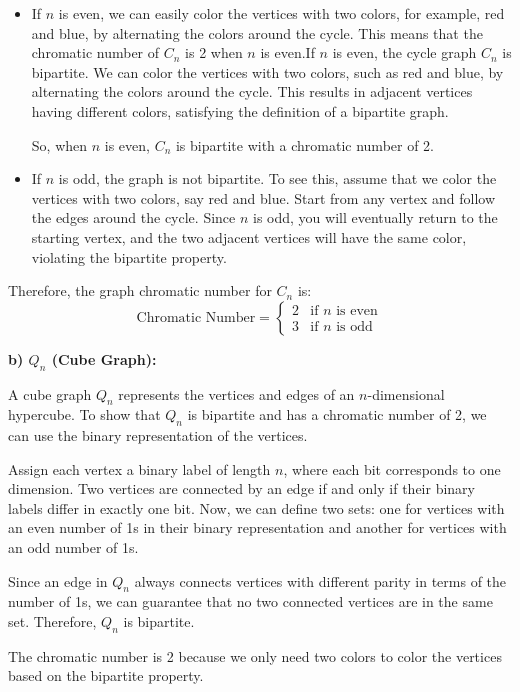 \documentclass[12pt]{article}
\begin{document}
\begin{itemize}
  \item If \(n\) is even, we can easily color the vertices with two colors, for example, red and blue, by alternating the colors around the cycle. This means that the chromatic number of \(C_n\) is 2 when \(n\) is even.If $n$ is even, the cycle graph $C_n$ is bipartite. We can color the vertices with two colors, such as red and blue, by alternating the colors around the cycle. This results in adjacent vertices having different colors, satisfying the definition of a bipartite graph.

So, when $n$ is even, $C_n$ is bipartite with a chromatic number of 2.

  \item If \(n\) is odd, the graph is not bipartite. To see this, assume that we color the vertices with two colors, say red and blue. Start from any vertex and follow the edges around the cycle. Since \(n\) is odd, you will eventually return to the starting vertex, and the two adjacent vertices will have the same color, violating the bipartite property.
\end{itemize}

Therefore, the graph chromatic number for \(C_n\) is:
\[
\text{Chromatic Number} = 
\begin{cases} 
2 & \text{if } n \text{ is even} \\
3 & \text{if } n \text{ is odd}
\end{cases}
\]

\textbf{b) \(Q_n\) (Cube Graph):}

A cube graph \(Q_n\) represents the vertices and edges of an \(n\)-dimensional hypercube. To show that \(Q_n\) is bipartite and has a chromatic number of 2, we can use the binary representation of the vertices.

Assign each vertex a binary label of length \(n\), where each bit corresponds to one dimension. Two vertices are connected by an edge if and only if their binary labels differ in exactly one bit. Now, we can define two sets: one for vertices with an even number of 1s in their binary representation and another for vertices with an odd number of 1s.

Since an edge in \(Q_n\) always connects vertices with different parity in terms of the number of 1s, we can guarantee that no two connected vertices are in the same set. Therefore, \(Q_n\) is bipartite.

The chromatic number is 2 because we only need two colors to color the vertices based on the bipartite property.
\end{document}
